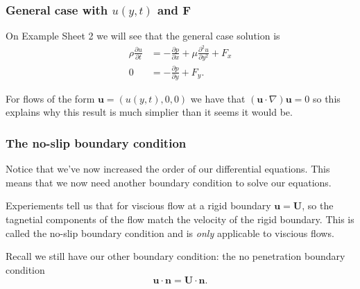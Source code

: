 \documentclass{article}
\begin{document}
\subsubsection{General case with $ u(y,t) $ and $ \mathbf F $}
On Example Sheet 2 we will see that the general case solution is
\begin{align*}
	\rho \frac{\partial u}{\partial t} &= -\frac{\partial p }{\partial x} + \mu\frac{\partial ^2 u}{\partial y^2} + F_x\\
	0 &= -\frac{\partial p}{\partial y} + F_y.
\end{align*}
\begin{remark}
  For flows of the form $ \mathbf u = (u(y,t), 0,0) $ we have that $ (\mathbf u \cdot \nabla) \mathbf u = 0 $ so this explains why this result is much simplier than it seems it would be.
\end{remark}
\subsubsection{The no-slip boundary condition}
Notice that we've now increased the order of our differential equations. This means that we now need another boundary condition to solve our equations. \par
Experiements tell us that for viscious flow at a rigid boundary $ \mathbf u = \mathbf U $, so the tagnetial components of the flow match the velocity of the rigid boundary. This is called the no-slip boundary condition and is \textit{only} applicable to viscious flows.\par
Recall we still have our other boundary condition: the no penetration boundary condition
\[
  \mathbf u \cdot\mathbf n = \mathbf U \cdot\mathbf n.
\]
\end{document}

